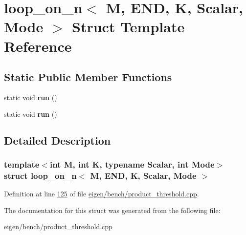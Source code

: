 \hypertarget{structloop__on__n_3_01_m_00_01_e_n_d_00_01_k_00_01_scalar_00_01_mode_01_4}{}\section{loop\+\_\+on\+\_\+n$<$ M, E\+ND, K, Scalar, Mode $>$ Struct Template Reference}
\label{structloop__on__n_3_01_m_00_01_e_n_d_00_01_k_00_01_scalar_00_01_mode_01_4}
\subsection*{Static Public Member Functions}
\begin{DoxyCompactItemize}
\item 
\mbox{\label{structloop__on__n_3_01_m_00_01_e_n_d_00_01_k_00_01_scalar_00_01_mode_01_4_ad5fbb3b12323dd6b09459e4d6197dc06}} 
static void {\bfseries run} ()
\item 
\mbox{\label{structloop__on__n_3_01_m_00_01_e_n_d_00_01_k_00_01_scalar_00_01_mode_01_4_ad5fbb3b12323dd6b09459e4d6197dc06}} 
static void {\bfseries run} ()
\end{DoxyCompactItemize}


\subsection{Detailed Description}
\subsubsection*{template$<$int M, int K, typename Scalar, int Mode$>$\newline
struct loop\+\_\+on\+\_\+n$<$ M, E\+N\+D, K, Scalar, Mode $>$}



Definition at line \hyperlink{eigen_2bench_2product__threshold_8cpp_source_l00125}{125} of file \hyperlink{eigen_2bench_2product__threshold_8cpp_source}{eigen/bench/product\+\_\+threshold.\+cpp}.



The documentation for this struct was generated from the following file\+:\begin{DoxyCompactItemize}
\item 
eigen/bench/product\+\_\+threshold.\+cpp\end{DoxyCompactItemize}

